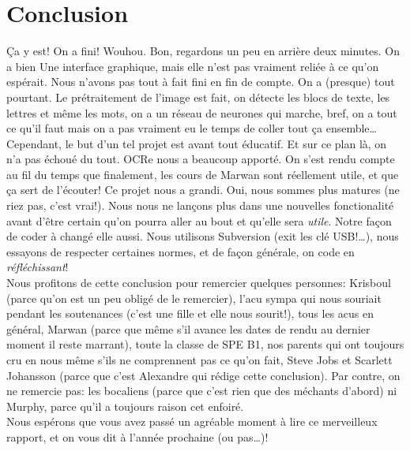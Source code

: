 \documentclass[a4paper,12pt]{report}
\begin{document}
		



\chapter{Conclusion} %
\label{cha:conclusion}

\c Ca y est! On a fini! Wouhou. Bon, regardons un peu en arri\`ere deux minutes. On a bien Une interface graphique, mais elle n'est pas vraiment reli\'ee \`a ce qu'on esp\'erait. Nous n'avons pas tout \`a fait fini en fin de compte. On a (presque) tout pourtant. Le pr\'etraitement de l'image est fait, on d\'etecte les blocs de texte, les lettres et m\^eme les mots, on a un r\'eseau de neurones qui marche, bref, on a tout ce qu'il faut mais on a pas vraiment eu le temps de coller tout \c ca ensemble\ldots \\
Cependant, le but d'un tel projet est avant tout \'educatif. Et sur ce plan l\`a, on n'a pas \'echou\'e du tout. OCRe nous a beaucoup apport\'e. On s'est rendu compte au fil du temps que finalement, les cours de Marwan sont r\'eellement utile, et que \c ca sert de l'\'ecouter! Ce projet nous a grandi. Oui, nous sommes plus matures (ne riez pas, c'est vrai!). Nous nous ne lan\c cons plus dans une nouvelles fonctionalit\'e avant d'\^etre certain qu'on pourra aller au bout et qu'elle sera \emph{utile}. Notre fa\c con de coder \`a chang\'e elle aussi. Nous utilisons Subversion (exit les cl\'e USB!\ldots), nous essayons de respecter certaines normes, et de fa\c con g\'en\'erale, on code en \emph{r\'efl\'echissant}! \\
Nous profitons de cette conclusion pour remercier quelques personnes: Krisboul (parce qu'on est un peu oblig\'e de le remercier), l'acu sympa qui nous souriait pendant les soutenances (c'est une fille et elle nous sourit!), tous les acus en g\'en\'eral, Marwan (parce que m\^eme s'il avance les dates de rendu au dernier moment il reste marrant), toute la classe de SPE B1, nos parents qui ont toujours cru en nous m\^eme s'ils ne comprennent pas ce qu'on fait, Steve Jobs et Scarlett Johansson (parce que c'est Alexandre qui r\'edige cette conclusion).
Par contre, on ne remercie pas: les bocaliens (parce que c'est rien que des m\'echants d'abord) ni Murphy, parce qu'il a toujours raison cet enfoir\'e.\\
Nous esp\'erons que vous avez pass\'e un agr\'eable moment \`a lire ce merveilleux rapport, et on vous dit \`a l'ann\'ee prochaine (ou pas\ldots)!
\end{document}

